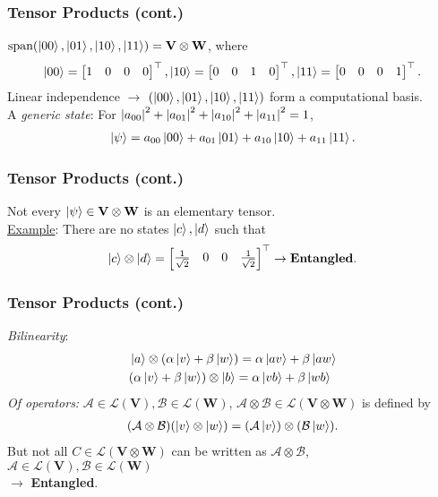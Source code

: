 \documentclass{beamer}
\theoremstyle{definition}
\newcommand{\V}{\mathbf{V}}
\newcommand{\W}{\mathbf{W}}
\newcommand{\A}{\mathcal{A}}
\newcommand{\B}{\mathcal{B}}
\newcommand{\xpan}{\text{span}}
\newcommand{\lag}{\mathcal{L}}
\begin{document}
\begin{frame}
\frametitle{Tensor Products (cont.)}

$\xpan(\ket{00}, \ket{01}, \ket{10}, \ket{11}) = \V\otimes \W$, where
\begin{align*}
\left\vert{00}\right\rangle = \begin{bmatrix}
1&0&0&0
\end{bmatrix}^\top, \left\vert{10}\right\rangle = \begin{bmatrix}
0&0&1&0
\end{bmatrix}^\top, \left\vert{11}\right\rangle = \begin{bmatrix}
0&0&0&1
\end{bmatrix}^\top.
\end{align*}
Linear independence $\rightarrow$ $(\left\vert{00}\right\rangle, \left\vert{01}\right\rangle, \left\vert{10}\right\rangle, \left\vert{11}\right\rangle)$ form a computational basis. \\
$\,$\\
A \textit{generic state}: For $\abs{a_{00}}^2 + \abs{a_{01}}^2 + \abs{a_{10}}^2 + \abs{a_{11}}^2 = 1$,
\begin{align*}
\left\vert{\psi}\right\rangle = a_{00}\left\vert{00}\right\rangle + a_{01}\left\vert{01}\right\rangle + a_{10}\left\vert{10}\right\rangle + a_{11}\left\vert{11}\right\rangle.
\end{align*}

\end{frame}


\begin{frame}
\frametitle{Tensor Products (cont.)}
Not every $\ket{\psi} \in \V\otimes \W$ is an elementary tensor. \\
$\,$\\
\underline{Example}: There are no states $\left\vert{c}\right\rangle, \left\vert{d}\right\rangle$ such that
\begin{align*}
\left\vert{c}\right\rangle \otimes \left\vert{d}\right\rangle = \begin{bmatrix}
\frac{1}{\sqrt{2}} & 0 & 0 & \frac{1}{\sqrt{2}}
\end{bmatrix}^\top \rightarrow \textbf{Entangled}.
\end{align*}
\end{frame}

\begin{frame}
\frametitle{Tensor Products (cont.)}
\textit{Bilinearity}:
\begin{align*}
&\left\vert{a}\right\rangle \otimes (\alpha\left\vert{v}\right\rangle + \beta\left\vert{w}\right\rangle) = \alpha\left\vert{av}\right\rangle + \beta\left\vert{aw}\right\rangle\\
&(\alpha\left\vert{v}\right\rangle + \beta\left\vert{w}\right\rangle) \otimes \left\vert{b}\right\rangle = \alpha\left\vert{vb}\right\rangle + \beta\left\vert{wb}\right\rangle
\end{align*}
\textit{Of operators:} $\A \in \mathfrak{\lag}(\V), \mathcal{B} \in \mathfrak{\lag}(\W)$, $\A\otimes \B \in \mathfrak{\lag}(\V \otimes \W)$ is defined by
\begin{align*}
(\A \otimes \B)(\ket{v}\otimes \ket{w}) = (\A\ket{v})\otimes (\B\ket{w}).
\end{align*}
But not all $C \in \mathfrak{\lag}(\V\otimes \W)$ can be written as $\A \otimes \B$, $\A \in \mathfrak{\lag}(\V), \mathcal{B} \in \mathfrak{\lag}(\W)$\\ $\rightarrow$ \textbf{Entangled}.
\end{frame}
\end{document}
